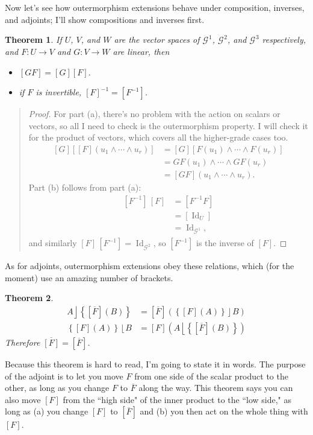 \documentclass{utarticle}
\newcommand{\G}[1][]{\ensuremath{\mathcal{G}_{#1}}}
\newcommand{\Id}{\operatorname{Id}}
\DeclareMathOperator{\lin}{\rfloor}
\DeclareMathOperator{\rin}{\lfloor}
\DeclareMathOperator{\out}{\wedge}
\newcommand{\adj}[1]{\ensuremath{\overline{#1}}}
\newcommand{\Out}[1]{\ensuremath{\left[#1\right]}}
\newtheorem{thm}{Theorem}
\newcommand{\bp}{\begin{quotation} \begin{proof}}
\newcommand{\ep}{\end{proof} \end{quotation}}
\begin{document}
Now let's see how outermorphism extensions behave under composition, inverses, and adjoints; 
I'll show compositions and inverses first.
\begin{thm}
If $U$, $V$, and $W$ are the vector spaces of $\G^1$, $\G^2$, and $\G^3$ respectively, and 
$F: U \rightarrow V$ and $G: V \rightarrow W$ are linear, then
\begin{itemize}
\item[(a)] $\Out{GF} = \Out{G} \Out{F}$.
\item[(b)] if $F$ is invertible, $\Out{F}^{-1} = \Out{F^{-1}}$.
\end{itemize}
\label{outercompadjinv}
\end{thm}
\bp
For part (a), there's no problem with the action on scalars or vectors, so all I need to check is the 
outermorphism property.  I will check it for the product of vectors, which covers all the higher-grade 
cases too.
\begin{align}
\Out{G}\left[\Out{F}(u_1 \out \dotsb \out u_r)\right] & = \Out{G}\left[F(u_1) \out \dotsb \out  F(u_r)\right] 
                                                                                                                                                            \nonumber \\
                                        & = GF(u_1) \out \dotsb \out GF(u_r) \nonumber \\
                                        & = \Out{GF}(u_1 \out \dotsb \out u_r).
\end{align}
Part (b) follows from part (a):
\begin{align}
\Out{F^{-1}}\,\Out{F} & = \Out{F^{-1}F} \nonumber \\
                                    & = \Out{\Id_U} \nonumber \\
                                    & = \Id_{\G^1},
\end{align}
and similarly $\Out{F}\,\Out{F^{-1}} = \Id_{\G^2}$, so \Out{F^{-1}} is the inverse of \Out{F}.
\ep

As for adjoints, outermorphism extensions obey these relations, which (for the moment) use an 
amazing number of brackets.
\begin{thm}
\begin{align}
A \lin \left\{\Out{\adj{F}}(B)\right\} & = \Out{\adj{F}}\left(\left\{\Out{F}(A)\right\} \lin B\right) \nonumber \\
\left\{\Out{F}(A)\right\} \rin B & = \Out{F}\left(A \rin \left\{\Out{\adj{F}}(B)\right\} \right)
\end{align}
Therefore $\adj{\Out{F}} = \Out{\adj{F}}$.
\label{outeradj}
\end{thm}
Because this theorem is hard to read, I'm going to state it in words.  The purpose of the adjoint 
is to let you move $F$ from one side of the scalar product to the other, as long as you change $F$ 
to \adj{F} along the way.  This theorem says you can also move $\Out{F}$ from the ``high side" of
the inner product to the ``low side," as long as (a) you change \Out{F} to \Out{\adj{F}} and (b) you 
then act on the whole thing with \Out{F}.  
\end{document}
